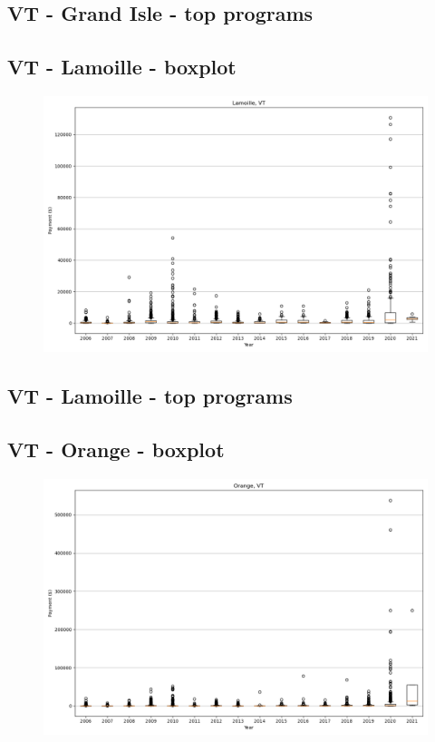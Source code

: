 \subsection*{VT - Grand Isle - top programs}

\newpage
\subsection*{VT - Lamoille - boxplot}
\begin{figure}[h]
\centering
\includegraphics[width=7in]{../output/boxplots/counties/Lamoille-VT_boxplot.png}
\end{figure}


\subsection*{VT - Lamoille - top programs}

\newpage
\subsection*{VT - Orange - boxplot}
\begin{figure}[h]
\centering
\includegraphics[width=7in]{../output/boxplots/counties/Orange-VT_boxplot.png}
\end{figure}


